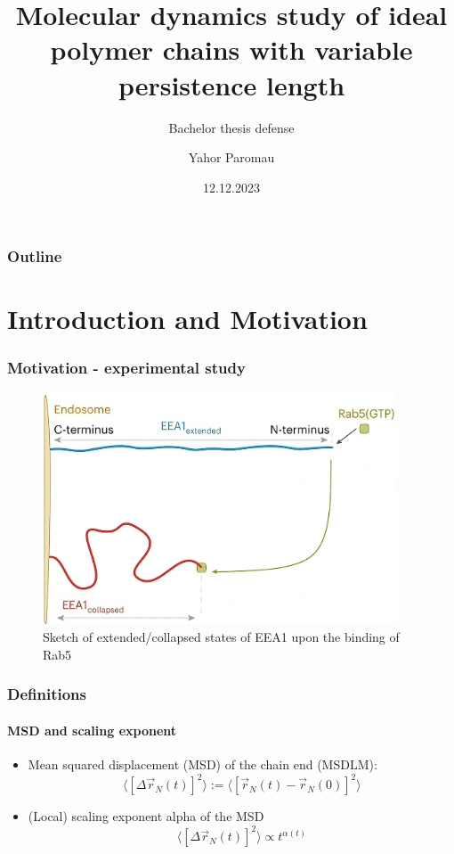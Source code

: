 \documentclass[handout]{beamer}
\title{Molecular dynamics study of ideal polymer chains with variable persistence length}
\subtitle{Bachelor thesis defense}
\author{Yahor Paromau}
\institute{ITP@IPF}
\date{12.12.2023}
\newcommand{\E}[1]{\langle#1\rangle}
\begin{document}
\begin{frame}
    \titlepage
\end{frame}


\begin{frame}
    \frametitle{Outline}
    \tableofcontents
\end{frame}

\section{Introduction and Motivation}


\begin{frame}
    \frametitle{Motivation - experimental study}
    \begin{figure}[h]
        \includegraphics[height=6.9cm]{./Singh_intro_a.png}
        \caption{
            Sketch of extended/collapsed states of EEA1 upon the binding of Rab5
            \cite{Singh:2022}
        }
    \end{figure}
\end{frame}


\begin{frame}
    \frametitle{Definitions}
    \framesubtitle{MSD and scaling exponent}
    \begin{itemize}
        \item Mean squared displacement (MSD) of the chain end (MSDLM):
        $$\E{[\Delta\vec{r}_N(t)]^2} := \E{[\vec{r}_N(t)-\vec{r}_N(0)]^2}$$
        \item (Local) scaling exponent alpha of the MSD \cite{Singh:2022}
        $$\E{[\Delta\vec{r}_N(t)]^2} \propto t^{\alpha(t)}$$
    \end{itemize}
\end{frame}
\end{document}
